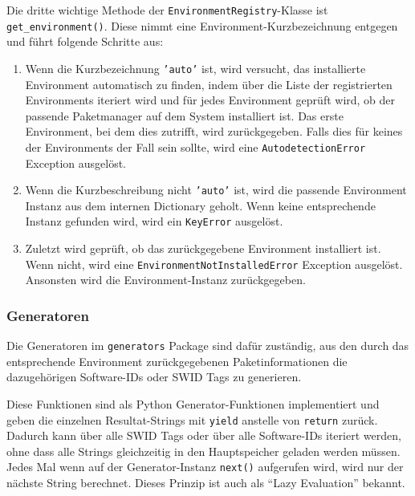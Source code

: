 Die dritte wichtige Methode der \texttt{EnvironmentRegistry}-Klasse ist
\texttt{get\_environment()}. Diese nimmt eine Environment-Kurzbezeichnung
entgegen und führt folgende Schritte aus:

\begin{enumerate}
	\item Wenn die Kurzbezeichnung \texttt{'auto'} ist, wird versucht, das
	installierte Environment automatisch zu finden, indem über die Liste der
	registrierten Environments iteriert wird und für jedes Environment geprüft
	wird, ob der passende Paketmanager auf dem System installiert ist. Das erste
	Environment, bei dem dies zutrifft, wird zurückgegeben. Falls dies für keines
	der Environments der Fall sein sollte, wird eine \texttt{AutodetectionError}
	Exception ausgelöst.
	
	\item Wenn die Kurzbeschreibung nicht \texttt{'auto'} ist, wird die passende
	Environment Instanz aus dem internen Dictionary geholt. Wenn keine
	entsprechende Instanz gefunden wird, wird ein \texttt{KeyError} ausgelöst.
		
	\item Zuletzt wird geprüft, ob das zurückgegebene Environment installiert
	ist. Wenn nicht, wird eine \texttt{EnvironmentNotInstalledError} Exception
	ausgelöst. Ansonsten wird die Environment-Instanz zurückgegeben.
\end{enumerate}

\subsubsection{Generatoren}
\label{swidgenerator:architektur:generatoren}

Die Generatoren im \texttt{generators} Package sind dafür zuständig, aus den
durch das entsprechende Environment zurückgegebenen Paketinformationen die
dazugehörigen Software-IDs oder SWID Tags zu generieren.

Diese Funktionen sind als Python Generator-Funktionen\cite[S.~94-95]{alchin2010pro}
implementiert und geben die einzelnen Resultat-Strings mit \texttt{yield}
anstelle von \texttt{return} zurück. Dadurch kann über alle SWID Tags oder über
alle Software-IDs iteriert werden, ohne dass alle Strings gleichzeitig in den
Hauptspeicher geladen werden müssen. Jedes Mal wenn auf der Generator-Instanz
\texttt{next()} aufgerufen wird, wird nur der nächste String berechnet. Dieses
Prinzip ist auch als \enquote{Lazy Evaluation}\cite[S.~85--93]{meyers1995more}
bekannt.

